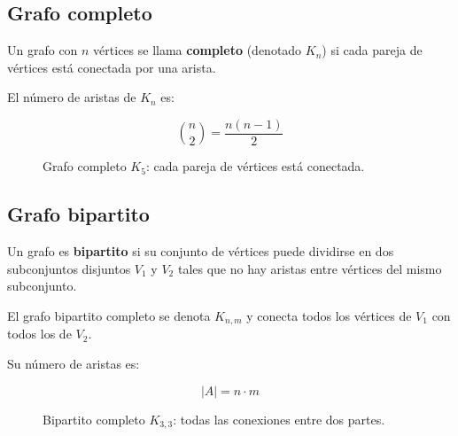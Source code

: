 \documentclass[12pt]{article}
\theoremstyle{plain}
\theoremstyle{definition}
\theoremstyle{remark}
\begin{document}
\subsection*{Grafo completo}

Un grafo con $n$ vértices se llama \textbf{completo} (denotado $K_n$) si cada pareja de vértices está conectada por una arista.

El número de aristas de $K_n$ es:

\[
\binom{n}{2} = \frac{n(n-1)}{2}
\]

\begin{figure}[htbp]
\centering
{}
\caption{Grafo completo $K_5$: cada pareja de vértices está conectada.}
\end{figure}

\subsection*{Grafo bipartito}

Un grafo es \textbf{bipartito} si su conjunto de vértices puede dividirse en dos subconjuntos disjuntos $V_1$ y $V_2$ tales que no hay aristas entre vértices del mismo subconjunto.

El grafo bipartito completo se denota $K_{n,m}$ y conecta todos los vértices de $V_1$ con todos los de $V_2$.

Su número de aristas es:

\[
|A| = n \cdot m
\]

\begin{figure}[htbp]
\centering
{}
\caption{Bipartito completo $K_{3,3}$: todas las conexiones entre dos partes.}
\end{figure}
\end{document}
